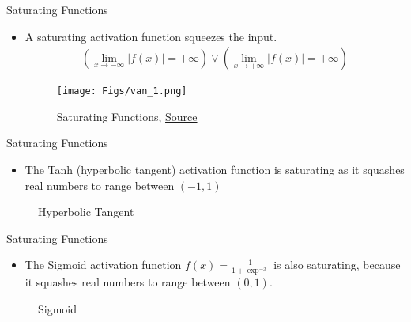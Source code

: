 \documentclass[compress,oilve,t]{beamer}
\newcommand{\tc}[2]{
	\textcolor{#1}{\hspace{-2pt}#2\hspace{-2pt}}
}
\begin{document}
\DeclarePairedDelimiter\abs{\lvert}{\rvert}%
\begin{frame}{Saturating Functions}
	\begin{itemize}
		\item A  \tc{keywords}{saturating} activation function squeezes the input.
		\begin{align*}
			(\lim_{x \to -\infty}|f(x)|=+\infty)
			\vee (\lim_{x \to +\infty}|f(x)|=+\infty)
		\end{align*}
		\begin{figure}[H]
			\centering
			\texttt{[image: Figs/van\_1.png]}
			\caption{Saturating Functions, \href{https://www.analyticsvidhya.com/blog/2021/06/the-challenge-of-vanishing-exploding-gradients-in-deep-neural-networks/}{Source}}
		\end{figure}
	\end{itemize}
\end{frame}

\begin{frame}{Saturating Functions}
	\begin{itemize}
		\item The Tanh (hyperbolic tangent) activation function is saturating as it squashes real numbers to range between $(-1, 1)$
	\end{itemize}
	\begin{figure}[H]
		\centering
		\caption{Hyperbolic Tangent}
	\end{figure}
\end{frame}

\begin{frame}{Saturating Functions}
	\begin{itemize}
		\item The Sigmoid activation function  $f(x) = \frac{1}{1+\exp^{-x}}$ is also saturating, because it squashes real numbers to range between $(0, 1)$.
	\end{itemize}
	\begin{figure}[H]
		\centering
		\caption{Sigmoid}
	\end{figure}
\end{frame}
\end{document}
